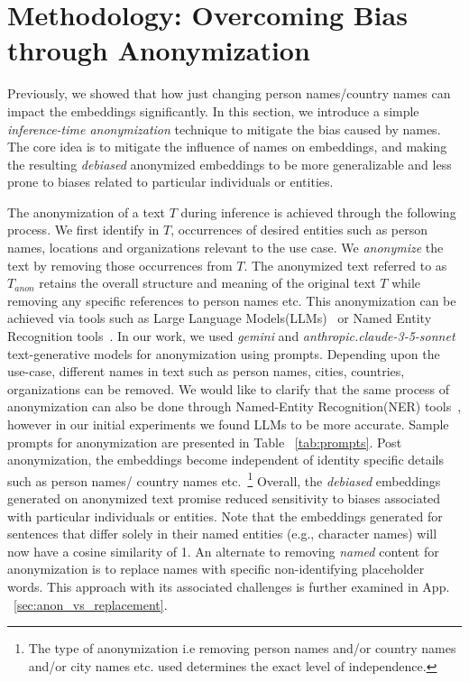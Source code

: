 \label{sec:method}




\section{Methodology: Overcoming Bias through Anonymization}
Previously, we showed that how just changing person names/country names can impact the embeddings significantly. In this section, we introduce a simple \textit{inference-time anonymization} technique to mitigate the bias caused by names. The core idea is to mitigate the influence of names on embeddings, and making the resulting \textit{debiased} anonymized embeddings to be more generalizable and less prone to biases related to particular individuals or entities.  

The anonymization of a text $T$ during inference is achieved through the following process. We first identify in $T$, occurrences of desired entities such as person names, locations and organizations relevant to the use case. We \textit{anonymize} the text by removing those occurrences from $T$.  The anonymized text referred to as $T_{anon}$ retains the overall structure and meaning of the original text $T$ while removing any specific references to person names etc.  This anonymization can be achieved via tools such as Large Language Models(LLMs)~\citep{zhao2023survey} or Named Entity Recognition tools~\citep{jehangir2023survey}. In our work, we used \textit{gemini} and \textit{anthropic.claude-3-5-sonnet} text-generative models for anonymization using prompts. Depending upon the use-case, different names in text such as person names, cities, countries, organizations can be removed. We would like to clarify that the same process of anonymization can also be done through Named-Entity Recognition(NER) tools~\citep{jehangir2023survey}, however in our initial experiments we found LLMs to be more accurate. Sample prompts for anonymization are presented in Table ~\ref{tab:prompts}. Post anonymization, the embeddings become independent of identity specific details such as person names/ country names etc.~\footnote{ The type of anonymization i.e removing person names and/or country names and/or city names etc. used determines the exact level of independence.} Overall, the \textit{debiased} embeddings generated on anonymized text promise reduced sensitivity to biases associated with particular individuals or entities. Note that the embeddings generated for sentences that differ solely in their named entities (e.g., character names) will now have a cosine similarity of 1.
\noindent
An alternate to removing \textit{named} content for anonymization is to replace names with specific non-identifying placeholder words. This approach with its associated challenges is further examined in App. ~\ref{sec:anon_vs_replacement}.




